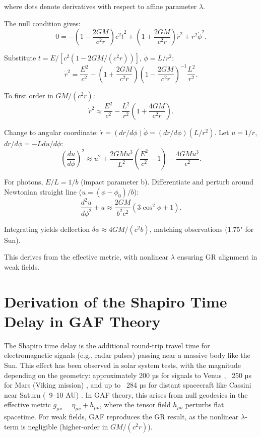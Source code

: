 \documentclass{article}
\begin{document}
where dots denote derivatives with respect to affine parameter \( \lambda \).

The null condition gives:
\[
0 = -\left(1 - \frac{2GM}{c^2 r}\right) c^2 \dot{t}^2 + \left(1 + \frac{2GM}{c^2 r}\right) \dot{r}^2 + r^2 \dot{\phi}^2.
\]

Substitute \( \dot{t} = E / [c^2 (1 - 2GM/(c^2 r))] \), \( \dot{\phi} = L / r^2 \):
\[
\dot{r}^2 = \frac{E^2}{c^2} - \left(1 + \frac{2GM}{c^2 r}\right) \left(1 - \frac{2GM}{c^2 r}\right)^{-1} \frac{L^2}{r^2}.
\]

To first order in \( GM/(c^2 r) \):
\[
\dot{r}^2 \approx \frac{E^2}{c^2} - \frac{L^2}{r^2} \left(1 + \frac{4GM}{c^2 r}\right).
\]

Change to angular coordinate: \( \dot{r} = (dr/d\phi) \dot{\phi} = (dr/d\phi) (L / r^2) \). Let \( u = 1/r \), \( dr/d\phi = -L du/d\phi \):
\[
\left( \frac{du}{d\phi} \right)^2 \approx u^2 + \frac{2GM u^3}{L^2} \left( \frac{E^2}{c^2} - 1 \right) - \frac{4GM u^3}{c^2}.
\]

For photons, \( E/L = 1/b \) (impact parameter b). Differentiate and perturb around Newtonian straight line (\( u = (\phi - \phi_0)/b \)):
\[
\frac{d^2 u}{d\phi^2} + u \approx \frac{2GM}{b^2 c^2} (3 \cos^2 \phi + 1).
\]

Integrating yields deflection \( \delta \phi \approx 4GM/(c^2 b) \), matching observations (1.75" for Sun).

This derives from the effective metric, with nonlinear \( \lambda \) ensuring GR alignment in weak fields.

\section{Derivation of the Shapiro Time Delay in GAF Theory}

The Shapiro time delay is the additional round-trip travel time for electromagnetic signals (e.g., radar pulses) passing near a massive body like the Sun. This effect has been observed in solar system tests, with the magnitude depending on the geometry: approximately 200 µs for signals to Venus \cite{Shapiro1968}, ~250 µs for Mars (Viking mission) \cite{Reasenberg1979}, and up to ~284 µs for distant spacecraft like Cassini near Saturn (~9–10 AU) \cite{Bertotti2003}. In GAF theory, this arises from null geodesics in the effective metric \( g_{\mu\nu} = \eta_{\mu\nu} + h_{\mu\nu} \), where the tensor field \( h_{\mu\nu} \) perturbs flat spacetime. For weak fields, GAF reproduces the GR result, as the nonlinear \( \lambda \)-term is negligible (higher-order in \( GM/(c^2 r) \)).
\end{document}
